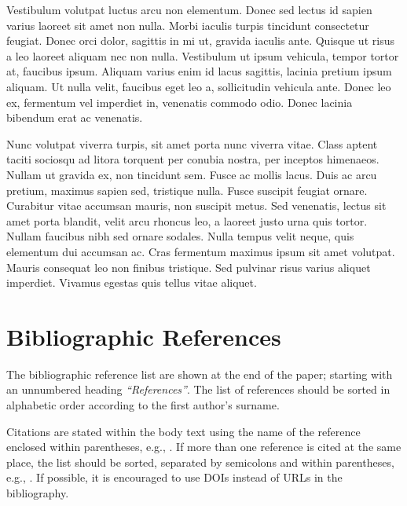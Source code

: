 \documentclass{modelica}
\begin{document}
Vestibulum volutpat luctus arcu non elementum. Donec sed lectus id sapien varius laoreet sit amet non nulla. Morbi iaculis turpis tincidunt consectetur feugiat. Donec orci dolor, sagittis in mi ut, gravida iaculis ante. Quisque ut risus a leo laoreet aliquam nec non nulla. Vestibulum ut ipsum vehicula, tempor tortor at, faucibus ipsum. Aliquam varius enim id lacus sagittis, lacinia pretium ipsum aliquam. Ut nulla velit, faucibus eget leo a, sollicitudin vehicula ante. Donec leo ex, fermentum vel imperdiet in, venenatis commodo odio. Donec lacinia bibendum erat ac venenatis.

Nunc volutpat viverra turpis, sit amet porta nunc viverra vitae. Class aptent taciti sociosqu ad litora torquent per conubia nostra, per inceptos himenaeos. Nullam ut gravida ex, non tincidunt sem. Fusce ac mollis lacus. Duis ac arcu pretium, maximus sapien sed, tristique nulla. Fusce suscipit feugiat ornare. Curabitur vitae accumsan mauris, non suscipit metus. Sed venenatis, lectus sit amet porta blandit, velit arcu rhoncus leo, a laoreet justo urna quis tortor. Nullam faucibus nibh sed ornare sodales. Nulla tempus velit neque, quis elementum dui accumsan ac. Cras fermentum maximus ipsum sit amet volutpat. Mauris consequat leo non finibus tristique. Sed pulvinar risus varius aliquet imperdiet. Vivamus egestas quis tellus vitae aliquet.

\section{Bibliographic References}
The bibliographic reference list are shown at the end of the paper;
starting with an unnumbered heading \emph{``References''}. The list of
references should be sorted in alphabetic order according to the first
author's surname.

Citations are stated within the body text using the name of the
reference enclosed within parentheses, e.g., \cite{Pantelides:1988}. If
more than one reference is cited at the same place, the list should be
sorted, separated by semicolons and within parentheses, e.g.,
\cite{DuffReid:1978,Pierce:2002,Plotkin:1981}. If possible, it is
encouraged to use DOIs instead of URLs in the bibliography.




\end{document}
